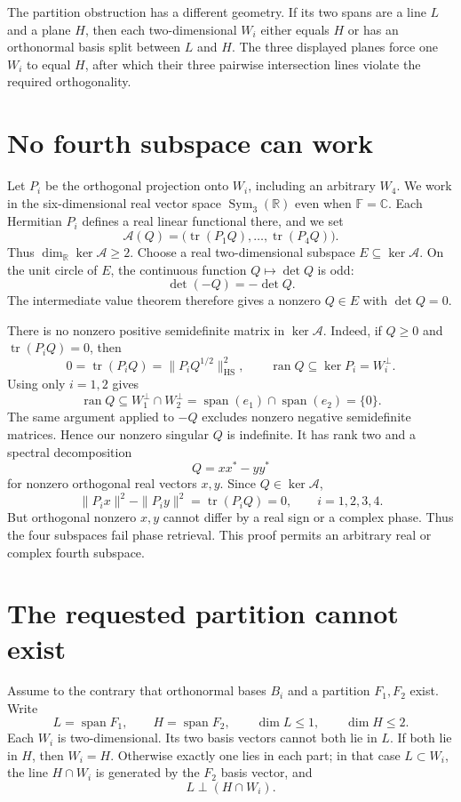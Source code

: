\documentclass[11pt]{article}
\newcommand{\F}{\mathbb F}
\newcommand{\R}{\mathbb R}
\newcommand{\C}{\mathbb C}
\newcommand{\Sym}{\operatorname{Sym}}
\newcommand{\ran}{\operatorname{ran}}
\newcommand{\tr}{\operatorname{tr}}
\newcommand{\spn}{\operatorname{span}}
\begin{document}
The partition obstruction has a different geometry.  If its two spans are a
line $L$ and a plane $H$, then each two-dimensional $W_i$ either equals $H$
or has an orthonormal basis split between $L$ and $H$.  The three displayed
planes force one $W_i$ to equal $H$, after which their three pairwise
intersection lines violate the required orthogonality.

\section*{No fourth subspace can work}

Let $P_i$ be the orthogonal projection onto $W_i$, including an arbitrary
$W_4$.  We work in the six-dimensional real vector space $\Sym_3(\R)$ even
when $\F=\C$.  Each Hermitian $P_i$ defines a real linear functional there,
and we set
\[
 \mathcal A(Q)=\bigl(\tr(P_1Q),\ldots,\tr(P_4Q)\bigr).
\]
Thus $\dim_\R\ker\mathcal A\ge2$.  Choose a real two-dimensional subspace
$E\subseteq\ker\mathcal A$.  On the unit circle of $E$, the continuous
function $Q\mapsto\det Q$ is odd:
\[
 \det(-Q)=-\det Q.
\]
The intermediate value theorem therefore gives a nonzero $Q\in E$ with
$\det Q=0$.

There is no nonzero positive semidefinite matrix in $\ker\mathcal A$.  Indeed,
if $Q\ge0$ and $\tr(P_iQ)=0$, then
\[
 0=\tr(P_iQ)=\|P_iQ^{1/2}\|_{\mathrm{HS}}^2,
 \qquad
 \ran Q\subseteq\ker P_i=W_i^\perp.
\]
Using only $i=1,2$ gives
\[
 \ran Q\subseteq W_1^\perp\cap W_2^\perp
 =\spn(e_1)\cap\spn(e_2)=\{0\}.
\]
The same argument applied to $-Q$ excludes nonzero negative semidefinite
matrices.  Hence our nonzero singular $Q$ is indefinite.  It has rank two and
a spectral decomposition
\[
 Q=xx^*-yy^*
\]
for nonzero orthogonal real vectors $x,y$.  Since $Q\in\ker\mathcal A$,
\[
 \|P_ix\|^2-\|P_iy\|^2
 =\tr(P_iQ)=0,
 \qquad i=1,2,3,4.
\]
But orthogonal nonzero $x,y$ cannot differ by a real sign or a complex phase.
Thus the four subspaces fail phase retrieval.  This proof permits an arbitrary
real or complex fourth subspace.

\section*{The requested partition cannot exist}

Assume to the contrary that orthonormal bases $B_i$ and a partition
$F_1,F_2$ exist.  Write
\[
 L=\spn F_1,
 \qquad H=\spn F_2,
 \qquad \dim L\le1,
 \qquad \dim H\le2.
\]
Each $W_i$ is two-dimensional.  Its two basis vectors cannot both lie in
$L$.  If both lie in $H$, then $W_i=H$.  Otherwise exactly one lies in each
part; in that case $L\subset W_i$, the line $H\cap W_i$ is generated by the
$F_2$ basis vector, and
\begin{equation}\label{eq:orthogonality}
 L\perp(H\cap W_i).
\end{equation}
\end{document}
